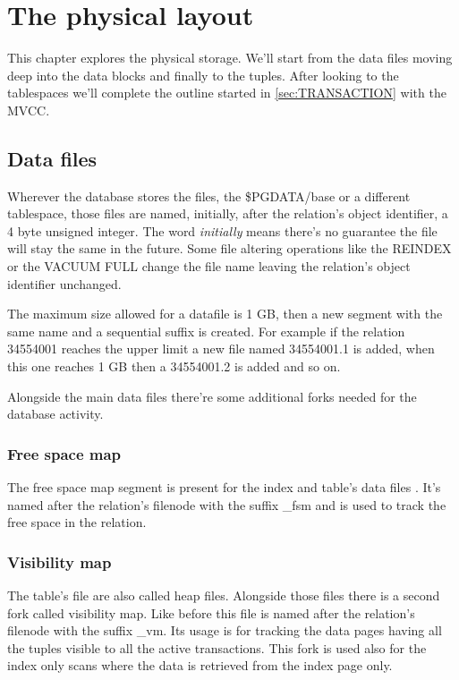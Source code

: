 \chapter{The physical layout}
\label{cha:PHYLAY}
This chapter explores the physical storage. We'll start from the data files 
moving deep into the data blocks and finally to the tuples.  After looking to 
the tablespaces we'll complete the outline started in \ref{sec:TRANSACTION} 
with the MVCC.

\section{Data files}
Wherever the database stores the files, the \$PGDATA/base or a different 
tablespace, those files are named, initially, after the relation's object 
identifier, a 4 byte unsigned integer. The word \textit{initially} means 
there's no guarantee the file will stay the same in the future.
Some file altering operations like the REINDEX or the VACUUM FULL change the 
file name leaving the relation's object identifier unchanged.

The maximum size allowed for a datafile is 1 GB, then a new segment with 
the same name and a sequential suffix is created. 
For example if the relation 34554001 reaches the upper limit a new file named 
34554001.1 is added, when this one reaches 1 GB then a 34554001.2 is added and 
so on. 

Alongside the main data files there're some additional forks needed for the 
database activity.

\subsection{Free space map}
The free space map segment is present for the index and 
table's data files . It's named after the relation's filenode with the suffix 
\_fsm and is used to track the free space in the relation. 

\subsection{Visibility map}
The table's file are also called heap files. Alongside those 
files there is a second fork called visibility map. Like before this file 
is named after the relation's filenode with the suffix \_vm.
Its usage is  for tracking the data pages  having all the tuples visible to all 
the active transactions. This fork is used also for the index only 
scans where the data is retrieved from the index page 
only.

